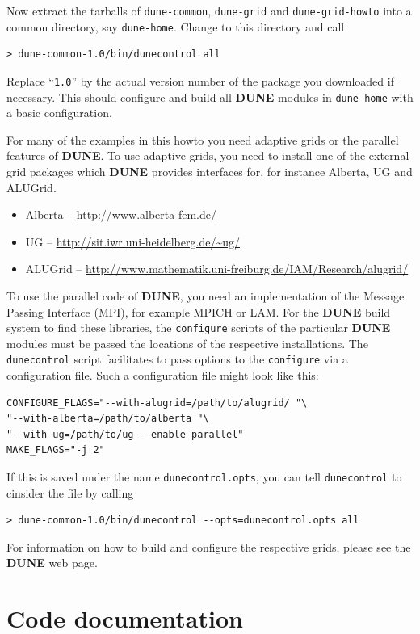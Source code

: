\documentclass[11pt,a4paper,headinclude,footinclude,DIV16,normalheadings]{scrreprt}
\newcommand{\Dune}{{\sf\bfseries DUNE}\xspace}
\begin{document}
Now extract the tarballs of \texttt{dune-common}, \texttt{dune-grid}
and \texttt{dune-grid-howto} into a common directory, say
\texttt{dune-home}.  Change to this directory and call
\begin{lstlisting}
> dune-common-1.0/bin/dunecontrol all
\end{lstlisting}
Replace ``\texttt{1.0}'' by the actual version number of the package
you downloaded if necessary.  This should configure and build all
\Dune{} modules in \texttt{dune-home} with a basic configuration.

For many of the examples in this howto you need adaptive grids or the
parallel features of \Dune{}.  To use adaptive grids, you need to
install one of the external grid packages which \Dune{} provides
interfaces for, for instance Alberta, UG and ALUGrid.
\begin{itemize}
\item Alberta -- \url{http://www.alberta-fem.de/}
\item UG -- \url{http://sit.iwr.uni-heidelberg.de/~ug/}
\item ALUGrid -- \url{http://www.mathematik.uni-freiburg.de/IAM/Research/alugrid/}
\end{itemize}
To use the parallel code of \Dune{}, you need an implementation of the
Message Passing Interface (MPI), for example MPICH or LAM.  For the
\Dune{} build system to find these libraries, the \texttt{configure}
scripts of the particular \Dune{} modules must be passed the locations
of the respective installations.  The \texttt{dunecontrol} script
facilitates to pass options to the \texttt{configure} via a
configuration file.  Such a configuration file might look like this:
\begin{lstlisting}
CONFIGURE_FLAGS="--with-alugrid=/path/to/alugrid/ "\
"--with-alberta=/path/to/alberta "\
"--with-ug=/path/to/ug --enable-parallel"
MAKE_FLAGS="-j 2"
\end{lstlisting}
If this is saved under the name \texttt{dunecontrol.opts}, you
can tell \texttt{dunecontrol} to cinsider the file by calling
\begin{lstlisting}
> dune-common-1.0/bin/dunecontrol --opts=dunecontrol.opts all
\end{lstlisting}

For information on how to build and configure the respective grids,
please see the \Dune{} web page.

\section{Code documentation}
\end{document}
